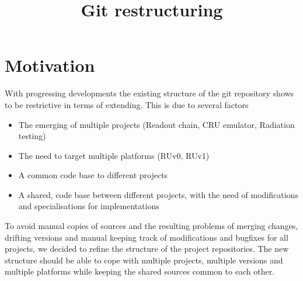 \documentclass{scrartcl}
\title{Git restructuring}
\begin{document}
\maketitle


\tableofcontents

\section{Motivation}

With progressing developments the existing structure of the git
repository shows to be restrictive in terms of extending. This is due
to several factors
\begin{itemize}
\item The emerging of multiple projects (Readout chain, CRU emulator,
  Radiation testing)
\item The need to target multiple platforms (RUv0, RUv1)
\item A common code base to different projects
\item A shared, code base between different projects, with the need of
  modifications and specialisations for implementations
\end{itemize}

To avoid manual copies of sources and the resulting problems of
merging changes, drifting versions and manual keeping track of
modifications and bugfixes for all projects, we decided to refine the
structure of the project repositories. The new structure should be
able to cope with multiple projects, multiple versions and multiple
platforms while keeping the shared sources common to each other.
\end{document}
